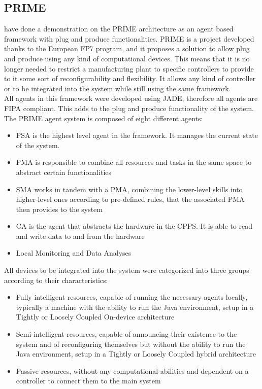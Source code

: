 \subsection{PRIME}

\citeauthor{PRIME_plug_and_produce} \cite{PRIME_plug_and_produce} have done a demonstration on the PRIME architecture as an agent based framework with plug and produce functionalities. PRIME is a project developed thanks to the European FP7 program, and it proposes a solution to allow plug and produce using any kind of computational devices. This means that it is no longer needed to restrict a manufacturing plant to specific controllers to provide to it some sort of reconfigurability and flexibility. It allows any kind of controller or to be integrated into the system while still using the same framework.\\

All agents in this framework were developed using JADE, therefore all agents are \gls{FIPA} compliant. This adds to the plug and produce functionality of the system. The PRIME agent system is composed of eight different agents:
\begin{itemize}
	\item \gls{PSA} is the highest level agent in the framework. It manages the current state of the system.
	\item \gls{PMA} is responsible to combine all resources and tasks in the same space to abstract certain functionalities
	\item \gls{SMA} works in tandem with a \gls{PMA}, combining the lower-level skills into higher-level ones according to pre-defined rules, that the associated \gls{PMA} then provides to the system
	\item \gls{CA} is the agent that abstracts the hardware in the \gls{CPPS}. It is able to read and write data to and from the hardware
	\item Local Monitoring and Data Analyses
\end{itemize}

All devices to be integrated into the system were categorized into three groups according to their characteristics:
\begin{itemize}
	\item Fully intelligent resources, capable of running the necessary agents locally, typically a machine with the ability to run the Java environment, setup in a Tightly or Loosely Coupled On-device architecture
	\item Semi-intelligent resources, capable of announcing their existence to the system and of reconfiguring themselves but without the ability to run the Java environment, setup in a Tightly or Loosely Coupled hybrid architecture
	\item Passive resources, without any computational abilities and dependent on a controller to connect them to the main system  
\end{itemize}

